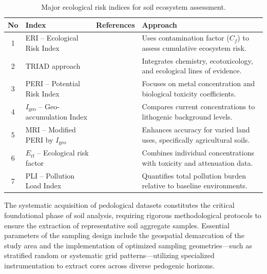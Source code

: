 \documentclass[environments,article,submit,pdftex,moreauthors]{Definitions/mdpi}
\begin{document}
\begin{table}[H]
\caption{Major ecological risk indices for soil ecosystem assessment.\label{tab2_expanded}}
\begin{tabularx}{\textwidth}{@{} c p{3.5cm} X p{5.5cm} @{}}
\toprule
\textbf{No} & \textbf{Index} & \textbf{References} & \textbf{Approach} \\
\midrule
1 & ERI -- Ecological Risk Index
    & \cite{Wang2025,Egbueri2020,Adewumi2024,ElSorogy2025,Sidoruk2023,Siddig2025,Proshad2025,AnsoarRodriguez2025}
    & Uses contamination factor ($C_f$) to assess cumulative ecosystem
      risk. \\[4pt]
2 & TRIAD approach
    & \cite{Kim2024,Chon2011,LindhLemenkova2023b,Rasafi2021,Stojic2019,Mohammad2025,Toumi2025,Yasir2025}
    & Integrates chemistry, ecotoxicology, and ecological lines of
      evidence. \\[4pt]
3 & PERI -- Potential Risk Index
    & \cite{AnsoarRodriguez2025,Ferreira2022,Li2025a,Sidoruk2023,Siddig2025,Li2020,Wang2024a,Wang2025}
    & Focuses on metal concentration and biological toxicity
      coefficients. \\[4pt]
4 & $I_{\mathrm{geo}}$ -- Geo-accumulation Index
    & \cite{Li2014,ElSorogy2025,Wang2020,Sidoruk2023,Siddig2025,AliZerrouki2021,LindhLemenkova2022a,Racic2025}
    & Compares current concentrations to lithogenic background
      levels. \\[4pt]
5 & MRI -- Modified PERI by $I_{\mathrm{geo}}$
    & \cite{Liu2021,Ferreira2022,Siddig2025,Li2019,Adewumi2024,Wang2024a,Wang2025,Proshad2025}
    & Enhances accuracy for varied land uses, specifically agricultural
      soils. \\[4pt]
6 & $E_{\mathrm{rf}}$ -- Ecological risk factor
    & \cite{Li2025a,Liu2021,Shetty2025,Marthandan2020,Sun2025,Sidoruk2023}
    & Combines individual concentrations with toxicity and attenuation
      data. \\[4pt]
7 & PLI -- Pollution Load Index
    & \cite{Li2022b,Chukwuonye2025,Wan2019,Mukhopadhyay2020,Sidoruk2023,Li2020,Wang2020,ElSorogy2025}
    & Quantifies total pollution burden relative to baseline
      environments. \\
\bottomrule
\end{tabularx}
\end{table}

The systematic acquisition of pedological datasets constitutes the critical
foundational phase of soil analysis, requiring rigorous methodological
protocols to ensure the extraction of representative soil aggregate samples.
Essential parameters of the sampling design include the geospatial demarcation
of the study area and the implementation of optimized sampling
geometries---such as stratified random or systematic grid patterns---utilizing
specialized instrumentation to extract cores across diverse pedogenic horizons.
\end{document}
